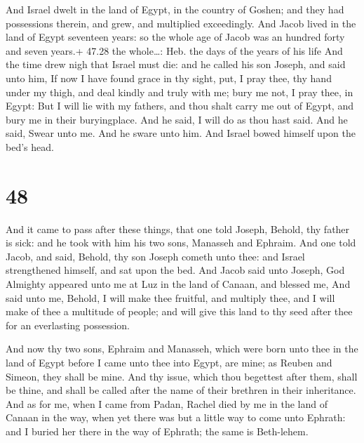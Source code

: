  And Israel dwelt in the land of Egypt, in the country of
Goshen; and they had possessions therein, and grew, and multiplied
exceedingly.  And Jacob lived in the land of Egypt
seventeen years: so the whole age of Jacob was an hundred forty and
seven years.+ 47.28 the whole\ldots: Heb. the days of the years of his
life  And the time drew nigh that Israel must die: and he
called his son Joseph, and said unto him, If now I have found grace in
thy sight, put, I pray thee, thy hand under my thigh, and deal kindly
and truly with me; bury me not, I pray thee, in Egypt:  But
I will lie with my fathers, and thou shalt carry me out of Egypt, and
bury me in their buryingplace. And he said, I will do as thou hast said.
 And he said, Swear unto me. And he sware unto him. And
Israel bowed himself upon the bed's head.

\hypertarget{section-47}{%
\section{48}\label{section-47}}

 And it came to pass after these things, that one told
Joseph, Behold, thy father is sick: and he took with him his two sons,
Manasseh and Ephraim.  And one told Jacob, and said, Behold,
thy son Joseph cometh unto thee: and Israel strengthened himself, and
sat upon the bed.  And Jacob said unto Joseph, God Almighty
appeared unto me at Luz in the land of Canaan, and blessed me,
 And said unto me, Behold, I will make thee fruitful, and
multiply thee, and I will make of thee a multitude of people; and will
give this land to thy seed after thee for an everlasting possession.

 And now thy two sons, Ephraim and Manasseh, which were
born unto thee in the land of Egypt before I came unto thee into Egypt,
are mine; as Reuben and Simeon, they shall be mine.  And thy
issue, which thou begettest after them, shall be thine, and shall be
called after the name of their brethren in their inheritance.
 And as for me, when I came from Padan, Rachel died by me in
the land of Canaan in the way, when yet there was but a little way to
come unto Ephrath: and I buried her there in the way of Ephrath; the
same is Beth-lehem.

